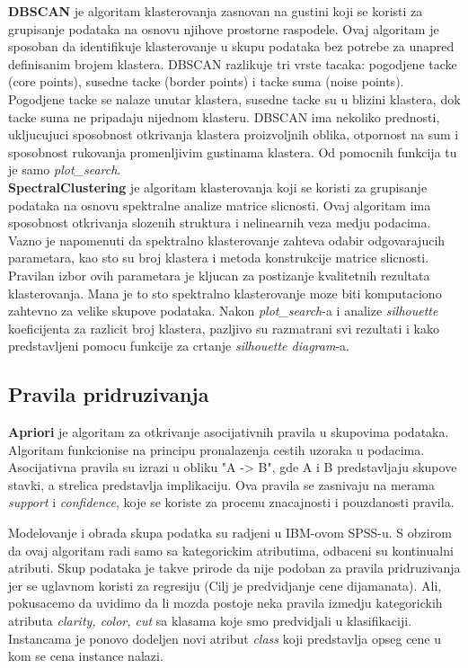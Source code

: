 \documentclass[10pt]{article}
\begin{document}
\textbf{DBSCAN} je algoritam klasterovanja zasnovan na gustini koji se koristi za grupisanje podataka na osnovu njihove prostorne raspodele. Ovaj algoritam je sposoban da identifikuje klasterovanje u skupu podataka bez potrebe za unapred definisanim brojem klastera. DBSCAN razlikuje tri vrste tacaka: pogodjene tacke (core points), susedne tacke (border points) i tacke suma (noise points). Pogodjene tacke se nalaze unutar klastera, susedne tacke su u blizini klastera, dok tacke suma ne pripadaju nijednom klasteru. DBSCAN ima nekoliko prednosti, ukljucujuci sposobnost otkrivanja klastera proizvoljnih oblika, otpornost na sum i sposobnost rukovanja promenljivim gustinama klastera. Od pomocnih funkcija tu je samo \textit{plot\_search}.\\

\textbf{SpectralClustering} je algoritam klasterovanja koji se koristi za grupisanje podataka na osnovu spektralne analize matrice slicnosti. Ovaj algoritam ima sposobnost otkrivanja slozenih struktura i nelinearnih veza medju podacima. Vazno je napomenuti da spektralno klasterovanje zahteva odabir odgovarajucih parametara, kao sto su broj klastera i metoda konstrukcije matrice slicnosti. Pravilan izbor ovih parametara je kljucan za postizanje kvalitetnih rezultata klasterovanja. Mana je to sto spektralno klasterovanje moze biti komputaciono zahtevno za velike skupove podataka. Nakon \textit{plot\_search}-a i analize \textit{silhouette} koeficijenta za razlicit broj klastera, pazljivo su razmatrani svi rezultati i kako predstavljeni pomocu funkcije za crtanje \textit{silhouette diagram}-a.\\

\subsection{Pravila pridruzivanja}
\textbf{Apriori} je algoritam za otkrivanje asocijativnih pravila u skupovima podataka. Algoritam funkcionise na principu pronalazenja cestih uzoraka u podacima. Asocijativna pravila su izrazi u obliku "A -> B", gde A i B predstavljaju skupove stavki, a strelica predstavlja implikaciju. Ova pravila se zasnivaju na merama \textit{support} i \textit{confidence}, koje se koriste za procenu znacajnosti i pouzdanosti pravila.

Modelovanje i obrada skupa podatka su radjeni u IBM-ovom SPSS-u. S obzirom da ovaj algoritam radi samo sa kategorickim atributima, odbaceni su kontinualni atributi. Skup podataka je takve prirode da nije podoban za pravila pridruzivanja jer se uglavnom koristi za regresiju (Cilj je predvidjanje cene dijamanata). Ali, pokusacemo da uvidimo da li mozda postoje neka pravila izmedju kategorickih atributa \textit{clarity, color, cut} sa klasama koje smo predvidjali u klasifikaciji. Instancama je ponovo dodeljen novi atribut \textit{class} koji predstavlja opseg cene u kom se cena instance nalazi.
\end{document}
